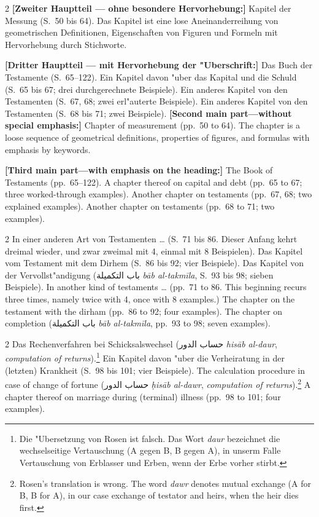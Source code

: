 \documentclass[10pt,a4paper]{article}
\renewcommand{\switchcolumn}{\syncronize\nointerlineskip\columnbreak}
\newcommand{\RL}[1]{\beginR#1\endR}
\newcommand{\ar}[1]{{\arabicfont\RL{#1}}}
\begin{document}
\begin{paracol}{2}
\textbf{[Zweiter Hauptteil --- ohne besondere Hervorhebung:]} Kapitel der Messung (S.\ 50 bis 64). Das Kapitel ist eine lose Aneinanderreihung von geometrischen Definitionen, Eigenschaften von Figuren und Formeln mit Hervorhebung durch Stichworte.

\textbf{[Dritter Hauptteil --- mit Hervorhebung der "Uberschrift:]} Das Buch der Testamente (S.\ 65--122). Ein Kapitel davon "uber das Kapital und die Schuld (S.\ 65 bis 67; drei durchgerechnete Beispiele). Ein anderes Kapitel von den Testamenten (S.\ 67, 68; zwei erl"auterte Beispiele). Ein anderes Kapitel von den Testamenten (S.\ 68 bis 71; zwei Beispiele).
\switchcolumn
\textbf{[Second main part---without special emphasis:]} Chapter of measurement (pp.\ 50 to 64). The chapter is a loose sequence of geometrical definitions, properties of figures, and formulas with emphasis by keywords.

\textbf{[Third main part---with emphasis on the heading:]} The Book of Testaments (pp.\ 65--122). A chapter thereof on capital and debt (pp.\ 65 to 67; three worked-through examples). Another chapter on testaments (pp.\ 67, 68; two explained examples). Another chapter on testaments (pp.\ 68 to 71; two examples).
\end{paracol}

\begin{paracol}{2}
In einer anderen Art von Testamenten \ldots{} (S.\ 71 bis 86. Dieser Anfang kehrt dreimal wieder, und zwar zweimal mit 4, einmal mit 8 Beispielen). Das Kapitel vom Testament mit dem Dirhem (S.\ 86 bis 92; vier Beispiele). Das Kapitel von der Vervollst"andigung (\ar{باب التكميلة} \textit{b\=ab al-takm\={i}la}, S.\ 93 bis 98; sieben Beispiele).
\switchcolumn
In another kind of testaments \ldots{} (pp.\ 71 to 86. This beginning recurs three times, namely twice with 4, once with 8 examples.) The chapter on the testament with the dirham (pp.\ 86 to 92; four examples). The chapter on completion (\ar{باب التكميلة} \textit{b\=ab al-takm\={i}la}, pp.\ 93 to 98; seven examples).
\end{paracol}

\begin{paracol}{2}
Das Rechenverfahren bei Schicksalswechsel (\ar{حساب الدور} \textit{his\=ab al-daur}, \textit{computation of returns}).\footnote{Die "Ubersetzung von Rosen ist falsch. Das Wort \textit{daur} bezeichnet die wechselseitige Vertauschung (A gegen B, B gegen A), in unserm Falle Vertauschung von Erblasser und Erben, wenn der Erbe vorher stirbt.} Ein Kapitel davon "uber die Verheiratung in der (letzten) Krankheit (S.\ 98 bis 101; vier Beispiele).
\switchcolumn
The calculation procedure in case of change of fortune (\ar{حساب الدور} \textit{\d{h}is\=ab al-dawr}, \textit{computation of returns}).\footnote{Rosen's translation is wrong. The word \textit{dawr} denotes mutual exchange (A for B, B for A), in our case exchange of testator and heirs, when the heir dies first.} A chapter thereof on marriage during (terminal) illness (pp.\ 98 to 101; four examples).
\end{paracol}
\end{document}

